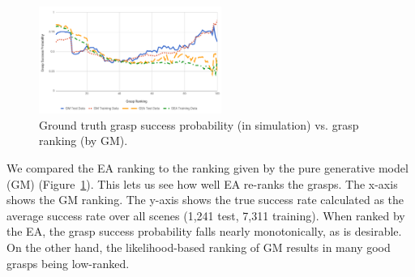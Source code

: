 \begin{figure}[t]
  \includegraphics[width=\linewidth,height=3.5cm]{images/successvsranking.png}
  \caption{Ground truth grasp success probability (in simulation) vs. grasp ranking (by GM).}
  \label{fig:successvsranking}
\end{figure}

We compared the EA ranking to the ranking given by the pure generative model (GM) (Figure~\ref{fig:successvsranking}). This lets us see how well EA re-ranks the grasps. The x-axis shows the GM ranking. The y-axis shows the true success rate calculated as the average success rate over all scenes (1,241 test, 7,311 training). When ranked by the EA, the grasp success probability falls nearly monotonically, as is desirable. On the other hand, the likelihood-based ranking of GM results in many good grasps being low-ranked. 



%
